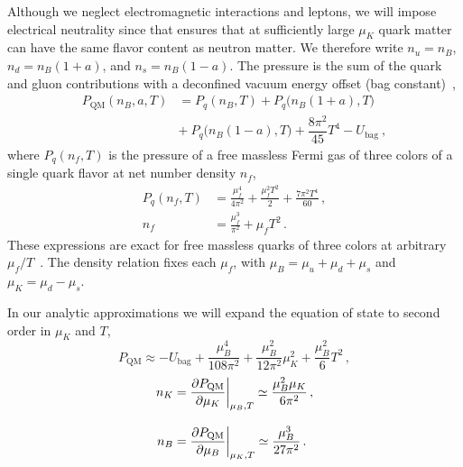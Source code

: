 \documentclass[10pt,superscriptaddress,
amsmath,aps,prc,twocolumn,nofootinbib,floatfix]{revtex4-1}
\newcommand{\mga}[1]{{\color[rgb]{0.6,0,0}#1}}
\begin{document}
\mga{
Although we neglect electromagnetic interactions and leptons, we will impose electrical neutrality since that ensures that at sufficiently large $\mu_K$ quark matter can have the same flavor content as neutron matter. We therefore write} $n_u=n_B$, $n_d=n_B(1+a)$, and $n_s=n_B(1-a)$.
The pressure is the sum of the quark  
and gluon contributions \mga{with a deconfined vacuum energy offset (bag constant)}~\cite{Madsen:1998uh,Buballa:2003qv},
\begin{equation}
\begin{array}{rl}
 P_\text{QM}(n_B,a,T) &= P_q(n_B,T)
 + P_q\bigl(n_B(1+a),T\bigr)  \\[1ex]
  & +\ P_q\bigl(n_B(1-a),T\bigr)
  +\dfrac{8\pi^2}{45}T^4-U_\text{bag} \ ,
\end{array}
 \label{eq:QM-bag-EoS}
\end{equation}
where $P_q(n_f,T)$ is the pressure of a free massless Fermi gas of three colors of a single quark flavor at net number density $n_f$,
\begin{align}
 P_q(n_f,T)&=\frac{\mu_f^4}{4\pi^2}+\frac{\mu_f^2T^2}{2}+\frac{7\pi^2T^4}{60}\,,\label{eq:P_f}\\
 n_f&=\frac{\mu_f^3}{\pi^2}+\mu_fT^2\,.\label{eq:n_f}
\end{align}
These expressions are exact for free massless quarks of three colors at arbitrary $\mu_f/T$~\cite[Eq.~(7.42)]{Laine:2022thermalnotes}.
The density relation fixes each $\mu_f$, with $\mu_B=\mu_u+\mu_d+\mu_s$ and $\mu_K=\mu_d-\mu_s$.

\mga{
In our analytic approximations we will expand the equation of state to second order in $\mu_K$ and $T$,}
\begin{equation}
 P_{\text{QM}} \approx -U_\text{bag}+\frac{\mu_B^4}{108\pi^2}
+
\frac{\mu_B^2}{12\pi^2}\mu_K^2
 +\frac{\mu_B^2}{6} T^2\,,
 \label{eq:QM-EoS-2nd-order}
\end{equation}
\begin{align}
 n_K & =\dfrac{\partial P_{\rm QM}}{\partial\mu_K}\biggr|_{\mu_B,T} \simeq \frac{\mu_B^2\mu_K}{6\pi^2}\,,
\label{eq:nK-approx}
 \\[2ex]
 n_B &=\dfrac{\partial P_{\rm QM}}{\partial\mu_B}\biggr|_{\mu_K,T}\simeq \dfrac{\mu_B^3}{27\pi^2}
 \,.
 \label{eq:nB-approx}
\end{align}
\end{document}
